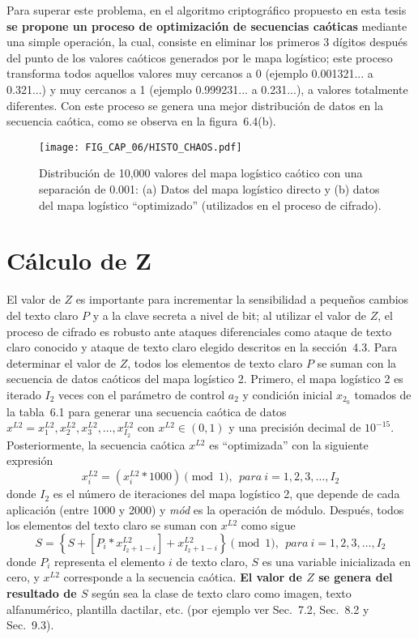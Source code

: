Para superar este problema, en el algoritmo criptográfico propuesto en esta tesis \textbf{se propone un proceso de optimización de secuencias caóticas} mediante una simple operación, la cual, consiste en eliminar los primeros 3 dígitos después del punto de los valores caóticos generados por le mapa logístico; este proceso transforma todos aquellos valores muy cercanos a 0 (ejemplo 0.001321... a 0.321...) y muy cercanos a 1 (ejemplo 0.999231... a 0.231...), a valores totalmente diferentes. Con este proceso se genera una mejor distribución de datos en la secuencia caótica, como se observa en la figura~6.4(b). \\

\begin{figure}[!htbp] %
	\center
	\texttt{[image: FIG\_CAP\_06/HISTO\_CHAOS.pdf]}     	 
	\caption{Distribución de 10,000 valores del mapa logístico caótico con una separación de 0.001: (a) Datos del mapa logístico directo y (b) datos del mapa logístico ``optimizado'' (utilizados en el proceso de cifrado).}
\end{figure}

\section{Cálculo de Z}
El valor de $Z$ es importante para incrementar la sensibilidad a pequeños cambios del texto claro $P$ y a la clave secreta a nivel de bit; al utilizar el valor de $Z$, el proceso de cifrado es robusto ante ataques diferenciales como ataque de texto claro conocido y ataque de texto claro elegido descritos en la sección~4.3. Para determinar el valor de $Z$, todos los elementos de texto claro $P$ se suman con la secuencia de datos caóticos del mapa logístico 2. Primero, el mapa logístico 2 es iterado $I_{2}$ veces con el parámetro de control $a_{2}$ y condición inicial $x_{2_{0}}$ tomados de la tabla~6.1 para generar una secuencia caótica de datos $x^{L2}={x_{1}^{L2},x_{2}^{L2},x_{3}^{L2},\ldots ,x_{I_{2}}^{L2}}$ con $x^{L2}\in (0,1)$ y una precisión decimal de $10^{-15}$. Posteriormente, la secuencia  caótica $x^{L2}$  es ``optimizada'' con la siguiente expresión
\begin{equation}
x_{i}^{L2}=\left( x_{i}^{L2}\ast 1000\right)\pmod 1,  ~~    para~i=1,2,3,\ldots,I_{2}
\end{equation}  
donde $I_{2}$ es el número de iteraciones del mapa logístico 2, que depende de cada aplicación (entre 1000 y 2000) y \textit{mód} es la operación de módulo. Después, todos los elementos del texto claro se suman con $x^{L2}$ como sigue
\begin{equation}
S=\left\lbrace S+[P_{i}\ast x_{I_{2}+1-i}^{L2}]+x_{I_{2}+1-i}^{L2}\right\rbrace \pmod 1,  ~~ para ~i=1,2,3,\ldots,I_{2}
\end{equation} 
donde $P_{i}$ representa el elemento $i$ de texto claro, $S$ es una variable inicializada en cero, y $x^{L2}$ corresponde a la secuencia caótica. \textbf{El valor de $Z$ se genera del resultado de $S$} según sea la clase de texto claro como imagen, texto alfanumérico, plantilla dactilar, etc. (por ejemplo ver Sec.~7.2, Sec.~8.2 y Sec.~9.3). 

